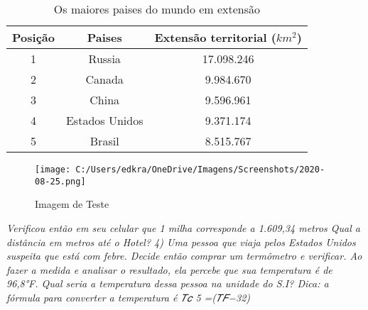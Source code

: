 \documentclass[a4paper,12pt]{article}
\begin{document}
\begin{table}[h]
\centering
\caption{Os maiores paises do mundo em extensão } \vspace*{0.5cm}
\begin{tabular}{c |cc}
Posição & Paises & Extensão territorial ($ km^{2} $)\\
\hline
1 & Russia & 17.098.246\\
2 & Canada & 9.984.670\\
3 & China & 9.596.961\\
4 & Estados Unidos & 9.371.174\\
5 & Brasil & 8.515.767
\end{tabular}
\end{table}

\begin{figure}[h]
	\centering
	\texttt{[image: C:/Users/edkra/OneDrive/Imagens/Screenshots/2020-08-25.png]}
	\label{ImagemTeste}
	\caption{Imagem de Teste}
\end{figure}

\begin{center}
 
	\textit{Verificou então em seu celular que 1 milha corresponde a 1.609,34 metros
Qual a distância em metros até o Hotel?
4) Uma pessoa que viaja pelos Estados Unidos suspeita que está com febre. Decide então 
comprar um termômetro e verificar. Ao fazer a medida e analisar o resultado, ela 
percebe que sua temperatura é de 96,8°F.
Qual seria a temperatura dessa pessoa na unidade do S.I?
Dica: a fórmula para converter a temperatura é 𝑇𝑐
5 =(𝑇𝐹−32)}

\end{center}
\end{document}
